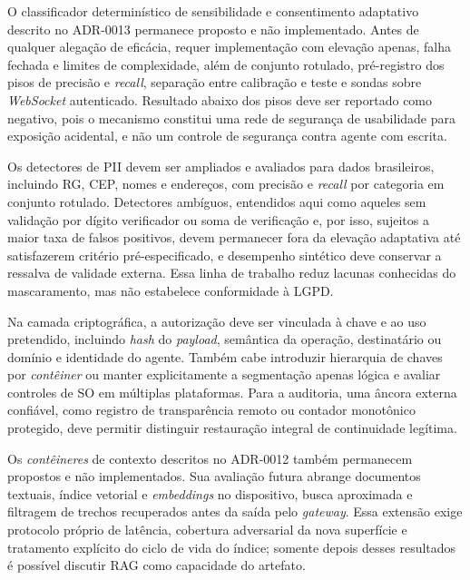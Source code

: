 O classificador determinístico de sensibilidade e consentimento adaptativo descrito no ADR-0013 permanece proposto e não implementado. Antes de qualquer alegação de eficácia, requer implementação com elevação apenas, falha fechada e limites de complexidade, além de conjunto rotulado, pré-registro dos pisos de precisão e \textit{recall}, separação entre calibração e teste e sondas sobre \textit{WebSocket} autenticado. Resultado abaixo dos pisos deve ser reportado como negativo, pois o mecanismo constitui uma rede de segurança de usabilidade para exposição acidental, e não um controle de segurança contra agente com escrita.

Os detectores de PII devem ser ampliados e avaliados para dados brasileiros, incluindo RG, CEP, nomes e endereços, com precisão e \textit{recall} por categoria em conjunto rotulado. Detectores ambíguos, entendidos aqui como aqueles sem validação por dígito verificador ou soma de verificação e, por isso, sujeitos a maior taxa de falsos positivos, devem permanecer fora da elevação adaptativa até satisfazerem critério pré-especificado, e desempenho sintético deve conservar a ressalva de validade externa. Essa linha de trabalho reduz lacunas conhecidas do mascaramento, mas não estabelece conformidade à LGPD.

Na camada criptográfica, a autorização deve ser vinculada à chave e ao uso pretendido, incluindo \textit{hash} do \textit{payload}, semântica da operação, destinatário ou domínio e identidade do agente. Também cabe introduzir hierarquia de chaves por \textit{contêiner} ou manter explicitamente a segmentação apenas lógica e avaliar controles de SO em múltiplas plataformas. Para a auditoria, uma âncora externa confiável, como registro de transparência remoto ou contador monotônico protegido, deve permitir distinguir restauração integral de continuidade legítima.

Os \textit{contêineres} de contexto descritos no ADR-0012 também permanecem propostos e não implementados. Sua avaliação futura abrange documentos textuais, índice vetorial e \textit{embeddings} no dispositivo, busca aproximada e filtragem de trechos recuperados antes da saída pelo \textit{gateway}. Essa extensão exige protocolo próprio de latência, cobertura adversarial da nova superfície e tratamento explícito do ciclo de vida do índice; somente depois desses resultados é possível discutir RAG como capacidade do artefato.

